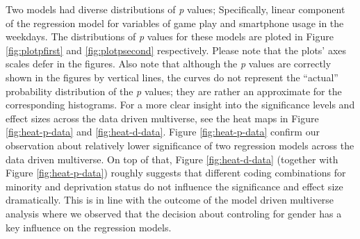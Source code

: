 \documentclass[man]{apa6}
\theoremstyle{definition}
\theoremstyle{definition}
\theoremstyle{definition}
\theoremstyle{remark}
\begin{document}
Two models had diverse distributions of \emph{p} values; Specifically,
linear component of the regression model for variables of game play and
smartphone usage in the weekdays. The distributions of \emph{p} values
for these models are ploted in Figure \ref{fig:plotpfirst} and
\ref{fig:plotpsecond} respectively. Please note that the plots' axes
scales defer in the figures. Also note that although the \emph{p} values
are correctly shown in the figures by vertical lines, the curves do not
represent the \enquote{actual} probability distribution of the \emph{p}
values; they are rather an approximate for the corresponding histograms.
For a more clear insight into the significance levels and effect sizes
across the data driven multiverse, see the heat maps in Figure
\ref{fig:heat-p-data} and \ref{fig:heat-d-data}. Figure
\ref{fig:heat-p-data} confirm our observation about relatively lower
significance of two regression models across the data driven multiverse.
On top of that, Figure \ref{fig:heat-d-data} (together with Figure
\ref{fig:heat-p-data}) roughly suggests that different coding
combinations for minority and deprivation status do not influence the
significance and effect size dramatically. This is in line with the
outcome of the model driven multiverse analysis where we observed that
the decision about controling for gender has a key influence on the
regression models.
\end{document}
